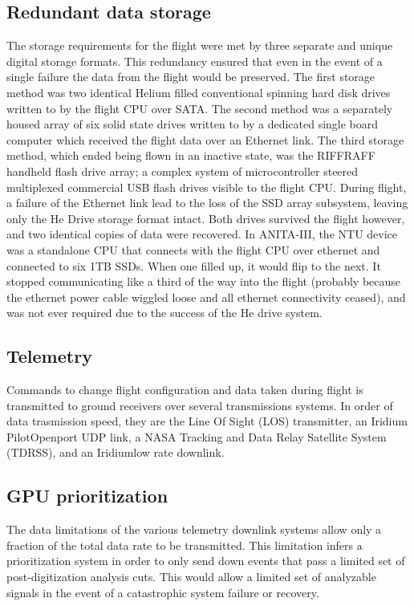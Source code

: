 	\subsection{Redundant data storage}
		The storage requirements for the flight were met by three separate and unique digital storage formats.  This redundancy ensured that even in the event of a single failure the data from the flight would be preserved.  The first storage method was two identical Helium filled conventional spinning hard disk drives written to by the flight CPU over SATA.  The second method was a separately housed array of six solid state drives written to by a dedicated single board computer which received the flight data over an Ethernet link.  The third storage method, which ended being flown in an inactive state, was the RIFFRAFF handheld flash drive array; a complex system of microcontroller steered multiplexed commercial USB flash drives visible to the flight CPU.  During flight, a failure of the Ethernet link lead to the loss of the SSD array subsystem, leaving only the He Drive storage format intact.  Both drives survived the flight however, and two identical copies of data were recovered.
		In ANITA-III, the NTU device was a standalone CPU that connects with the flight CPU over ethernet and connected to six 1TB SSDs.  When one filled up, it would flip to the next.  It stopped communicating like a third of the way into the flight (probably because the ethernet power cable wiggled loose and all ethernet connectivity ceased), and was not ever required due to the success of the He drive system.
		
	
	\subsection{Telemetry}
		Commands to change flight configuration and data taken during flight is transmitted to ground receivers over several transmissions systems.  In order of data trasmission speed, they are the Line Of Sight (LOS) transmitter, an Iridium Pilot\textregistered Openport UDP link, a NASA Tracking and Data Relay Satellite System (TDRSS), and an Iridium\textregistered low rate downlink.    
		
	\subsection{GPU prioritization}
		The data limitations of the various telemetry downlink systems allow only a fraction of the total data rate to be transmitted.  This limitation infers a prioritization system in order to only send down events that pass a limited set of post-digitization analysis cuts.  This would allow a limited set of analyzable signals in the event of a catastrophic system failure or recovery.
			
